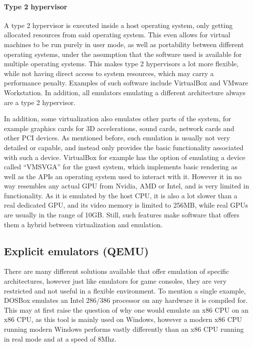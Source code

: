 \paragraph{Type 2 hypervisor} A type 2 hypervisor is executed inside a host operating system,
only getting allocated resources from said operating system.
This even allows for virtual machines to be run purely in user mode,
as well as portability between different operating systems,
under the assumption that the software used is available for multiple operating systems.
This makes type 2 hypervisors a lot more flexible,
while not having direct access to system resources,
which may carry a performance penalty.
Examples of such software include VirtualBox and VMware Workstation\cite{hypervisor}.
In addition, all emulators emulating a different architecture always are a type 2 hypervisor.

In addition, some virtualization also emulates other parts of the system,
for example graphics cards for 3D accelerations, sound cards, network cards
and other PCI devices.
As mentioned before, such emulation is usually not very detailed or capable,
and instead only provides the basic functionality associated with such a device.
VirtualBox for example has the option of emulating a device called \enquote{VMSVGA}
for the guest system, which implements basic rendering as well as the APIs
an operating system used to interact with it.
However it in no way resembles any actual GPU from Nvidia, AMD or Intel,
and is very limited in functionality.
As it is emulated by the host CPU, it is also a lot slower than a real dedicated GPU,
and its video memory is limited to 256MB, while real GPUs are usually in the range of 10GB.
Still, such features make software that offers them a hybrid between virtualization and emulation.

\subsection{Explicit emulators (QEMU)}
There are many different solutions available that offer emulation of specific architectures,
however just like emulators for game consoles, they are very restricted and not useful in a flexible environment.
To mention a single example, DOSBox emulates an Intel 286/386 processor on any hardware it is compiled for.
This may at first raise the question of why one would emulate an x86 CPU on an x86 CPU,
as this tool is mainly used on Windows,
however a modern x86 CPU running modern Windows performs vastly differently than
an x86 CPU running in real mode and at a speed of 8Mhz.

